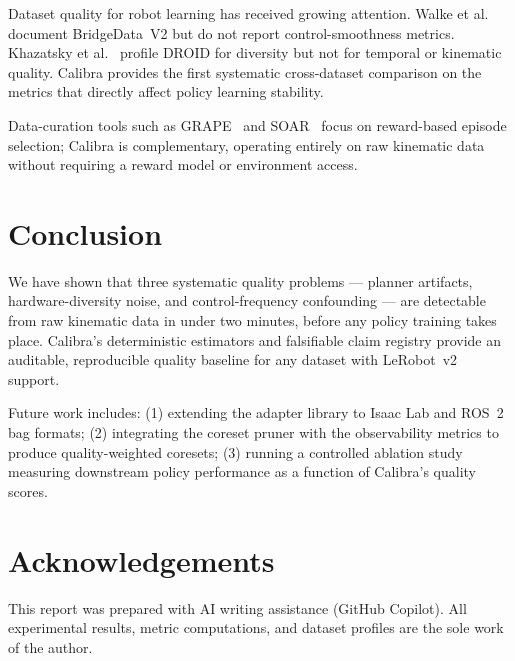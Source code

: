 \documentclass[10pt,twocolumn]{article}
\begin{document}
Dataset quality for robot learning has received growing attention.
Walke et al.~\cite{walke2023bridgedata} document BridgeData~V2 but do not report
control-smoothness metrics. Khazatsky et al.~\cite{khazatsky2024droid} profile DROID
for diversity but not for temporal or kinematic quality. Calibra provides
the first systematic cross-dataset comparison on the metrics that directly
affect policy learning stability.

Data-curation tools such as GRAPE~\cite{hejna2023} and
SOAR~\cite{ma2023} focus on reward-based episode selection; Calibra
is complementary, operating entirely on raw kinematic data without
requiring a reward model or environment access.

\section{Conclusion}
\label{sec:conclusion}

We have shown that three systematic quality problems — planner artifacts,
hardware-diversity noise, and control-frequency confounding — are
detectable from raw kinematic data in under two minutes, before any
policy training takes place. Calibra's deterministic estimators and
falsifiable claim registry provide an auditable, reproducible quality
baseline for any dataset with LeRobot~v2 support.

Future work includes: (1) extending the adapter library to Isaac Lab and
ROS~2 bag formats; (2) integrating the coreset pruner with the
observability metrics to produce quality-weighted coresets; (3) running
a controlled ablation study measuring downstream policy performance as a
function of Calibra's quality scores.

\section*{Acknowledgements}
This report was prepared with AI writing assistance (GitHub Copilot).
All experimental results, metric computations, and dataset profiles
are the sole work of the author.
\end{document}
